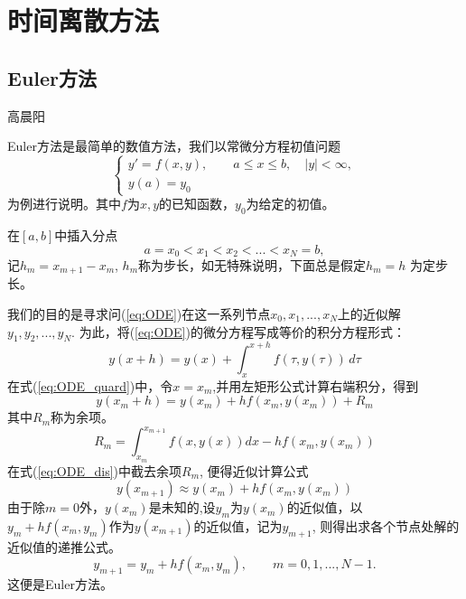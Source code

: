 \section{时间离散方法}

\subsection{Euler方法}
{\color{red}\begin{center}
     高晨阳
\end{center}}
Euler方法是最简单的数值方法，我们以常微分方程初值问题
\begin{equation}\label{eq:ODE}
		\begin{cases}
				y'=f(x,y), \quad\quad a\le x\le b , \quad |y| < \infty ,\\
				y(a)=y_0
		\end{cases}
\end{equation}
为例进行说明。其中$f$为$x,y$的已知函数，$y_0$为给定的初值。

在$[a,b]$中插入分点
$$ a = x_0 < x_1 <x_2 < ... < x_N = b ,$$
记$h_m = x_{m+1}- x_{m}$, $h_m$称为步长，如无特殊说明，下面总是假定$h_m = h$
为定步长。

我们的目的是寻求问(\ref{eq:ODE})在这一系列节点$x_0, x_1, ... ,x_N$上的近似解$y_1, y_2,... , y_N$. 为此，将(\ref{eq:ODE})的微分方程写成等价的积分方程形式：
\begin{equation}\label{eq:ODE_quard}
		y(x+h)=y(x)+\int_x^{x+h} f(\tau, y(\tau)) \, d\tau
\end{equation}
在式(\ref{eq:ODE_quard})中，令$x=x_m$,并用左矩形公式计算右端积分，得到
\begin{equation}\label{eq:ODE_dis}
		y(x_m+h)= y(x_m) +h f(x_m, y(x_m)) + R_m
\end{equation}
其中$R_m$称为余项。
\begin{equation}\label{eq:Rm}
		R_m=\int_{x_m}^{x_{m+1}}f(x, y(x))dx- h f(x_m,y(x_m))
\end{equation}
在式(\ref{eq:ODE_dis})中截去余项$R_m$, 便得近似计算公式
\begin{equation}\label{eq:ODE_solution}
		y(x_{m+1}) \approx y(x_m) + h f(x_m,y(x_m))
\end{equation}
由于除$m=0$外，$y(x_m)$是未知的,设$y_m$为$y(x_m)$的近似值，以$y_m+h f( x_m, y_m)$作为$ y(x_{m+1})$的近似值，记为$y_{m+1}$, 则得出求各个节点处解的近似值的递推公式。
\begin{equation}
		y_{m+1} = y_m + h f(x_m , y_m), \quad \quad m = 0, 1, ... ,N-1.
\end{equation}
这便是Euler方法。

